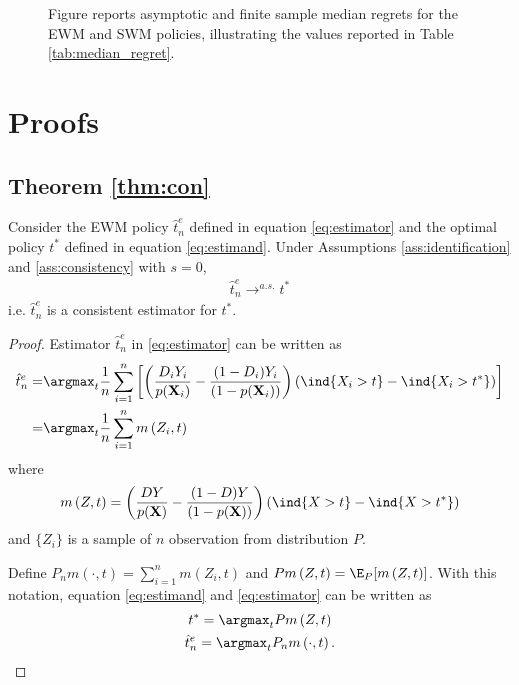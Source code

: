 {\begin{figure}
\begin{center}
\caption{\small Figure reports asymptotic and finite sample median regrets for the EWM and SWM policies, illustrating the values reported in Table \ref{tab:median_regret}.}
\label{fig:median_reg_model2}
\end{center}
\end{figure}

\newpage
\section{Proofs}
\setcounter{thm}{0}
\subsection*{Theorem \ref{thm:con}}
\begin{thm}
Consider the EWM policy $\hat{t}^e_n$ defined in equation \eqref{eq:estimator} and the optimal policy $t^*$ defined in equation \eqref{eq:estimand}. Under Assumptions \ref{ass:identification} and \ref{ass:consistency} with $s=0$,
\begin{gather*}
    \hat{t}^e_n \rightarrow^{a.s.} t^*
\end{gather*}
i.e. $\hat{t}^e_n$ is a consistent estimator for $t^*$.
\end{thm}
\begin{proof}
Estimator $\hat{t}^e_n$ in \eqref{eq:estimator} can be written as
\begin{align}
    \hat{t}^e_n= & \argmax_{t} \frac{1}{n} \sum_{i=1}^n \left[\left(\frac{D_i Y_i}{p(\textbf{X}_i)} - \frac{(1-D_i) Y_i}{(1-p(\textbf{X}_i))} \right) (\ind\{X_i > t\} - \ind\{X_i > t^* \}) \right]  \\
    =& \argmax_{t} \frac{1}{n} \sum_{i=1}^n m\left(Z_i, t\right) 
\end{align}
where
\begin{gather}
    m\left(Z, t\right)=\left(\frac{D Y}{p(\textbf{X})} - \frac{(1-D) Y}{(1-p(\textbf{X}))} \right) \left(\ind\{X > t\} - \ind\{X > t^*\} \right)
\end{gather}
and $\{Z_i\}$ is a sample of $n$ observation from distribution $P$.

Define $P_n m\left(\cdot, t\right) = \sum_{i=1}^n m\left(Z_i, t\right)$ and $P m\left(Z, t\right) = \E_P[ m\left(Z, t\right)]$. With this notation, equation \eqref{eq:estimand} and \eqref{eq:estimator} can be written as
\begin{gather}
    t^* = \argmax_{t} P m\left(Z, t\right) \\
    \hat{t}^e_n= \argmax_{t} P_n m\left(\cdot, t\right).
\end{gather}


\end{proof}}
